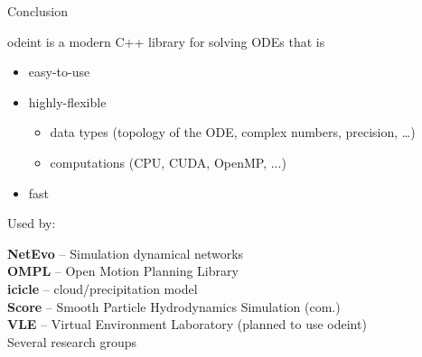 \documentclass{beamer}
\newcommand{\heading}[1]{\centerline{\Large #1} \vspace{0.5em}}
\newcommand{\odeint}[0]{odeint}
\begin{document}
\begin{frame}[fragile]
 \heading{Conclusion}

\vspace{2ex}

odeint is a modern C++ library for solving ODEs that is

\begin{itemize}
 \item easy-to-use
 \item highly-flexible
 \begin{itemize}
  \item data types (topology of the ODE, complex numbers, precision, \dots)
  \item computations (CPU, CUDA, OpenMP, ...)
 \end{itemize}
 \item fast
\end{itemize}


\vspace{1ex}

Used by:
\vspace{1ex}

\textbf{NetEvo} -- Simulation dynamical networks\\
\textbf{OMPL} -- Open Motion Planning Library\\
\textbf{icicle} -- cloud/precipitation model\\
\textbf{Score} -- Smooth Particle Hydrodynamics Simulation (com.)\\
\textbf{VLE} -- Virtual Environment Laboratory (planned to use \odeint )\\

\vspace{1ex}
Several research groups

\end{frame}
\end{document}
